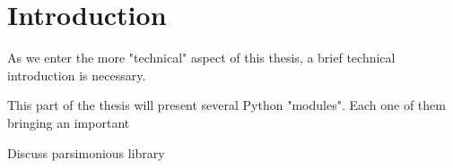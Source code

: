 \chapter{Introduction}

\vspace{0.5cm}

As we enter the more "technical" aspect of this thesis, a brief technical introduction is necessary.\newline

This part of the thesis will present several Python "modules". Each one of them  bringing an important

Discuss parsimonious library